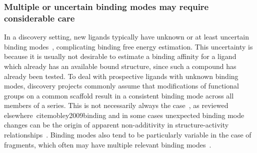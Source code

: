 \documentclass[9pt,bestpractices]{livecoms}
\begin{document}
%
%



\subsubsection{Multiple or uncertain binding modes may require considerable care}
\label{sec:multiple_binding_modes}

In a discovery setting, new ligands typically have unknown or at least uncertain binding modes~\cite{kaus2015how, plountprice2000analysis,mobley2009binding,calabro2016elucidation},  complicating binding free energy estimation.
This uncertainty is because it is usually not desirable to estimate a binding affinity for a ligand which already has an available bound structure, since such a compound has already been tested.
To deal with prospective ligands with unknown binding modes, discovery projects commonly assume that modifications of functional groups on a common scaffold result in a consistent binding mode across all members of a series.
This is not necessarily always the case~\cite{kaus2015how}, as reviewed elsewhere~cite{mobley2009binding} and in some cases unexpected binding mode changes can be the origin of apparent non-additivity in structure-activity relationships~\cite{calabro2016elucidation}.
Binding modes also tend to be particularly variable in the case of fragments, which often may have multiple relevant binding modes~\cite{}.
\end{document}
